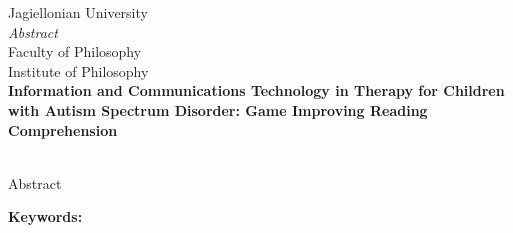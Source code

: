 \thispagestyle{firststyle}
{\centering\large
    \vspace{0.5cm}
    Jagiellonian University\\
    {\Huge\emph{Abstract}\\}
    \vspace{0.5cm}
    Faculty of Philosophy\\Institute of Philosophy\\
    \vspace{1cm}
    \textbf{Information and Communications Technology in Therapy for Children with Autism Spectrum Disorder: Game Improving Reading Comprehension\\}
    \vspace{0.5cm}
    \authorname\\
    \vspace{0.5cm}
}

Abstract

\vspace{1cm}
\noindent\textbf{Keywords: }